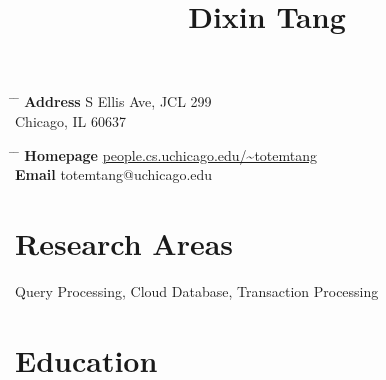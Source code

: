 \documentclass[10pt]{article} %
\begin{document}

\title{Dixin Tang} %


\parbox{0.5\textwidth}{ %
\begin{tabbing} %
\hspace{2.5cm} \= \hspace{4cm} \= \kill %
{\bf Address}  S Ellis Ave, JCL 299 \\ %
\> Chicago, IL 60637 \\ %
\end{tabbing}}
\hfill %
\parbox{0.5\textwidth}{ %
\begin{tabbing} %
\hspace{2.5cm} \= \hspace{4cm} \= \kill %
{\bf Homepage} \> \href{http://people.cs.uchicago.edu/~totemtang}{\url{people.cs.uchicago.edu/~totemtang}} \\ 
{\bf Email} \> totemtang@uchicago.edu \\ %
\end{tabbing}}
\vspace{-10mm}

\section{Research Areas}

Query Processing, Cloud Database, Transaction Processing

\vspace{-5mm}

\section{Education}
\end{document}
